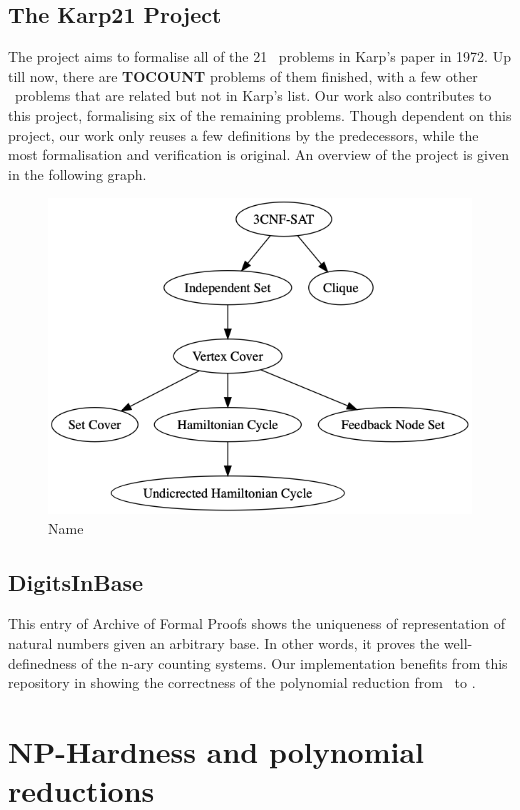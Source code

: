\subsection*{The Karp21 Project}
The project aims to formalise all of the 21 \NPH\ problems in Karp's paper in 1972. Up till now, there are \textbf{TOCOUNT} problems of them finished, with a few other \NPH\ problems that are related but not in Karp's list. Our work also contributes to this project, formalising six of the remaining problems. Though dependent on this project, our work only reuses a few definitions by the predecessors, while the most formalisation and verification is original. An overview of the project is given in the following graph.
\begin{figure}[h!]
\centering
\includegraphics[scale=0.4]{figures/reductions.png}
\caption{Name}
\end{figure}

\subsection*{DigitsInBase}
This entry of Archive of Formal Proofs shows the uniqueness of representation of natural numbers given an arbitrary base. In other words, it proves the well-definedness of the n-ary counting systems. Our implementation benefits from this repository in showing the correctness of the polynomial reduction from \XC\ to \Part.

\section{NP-Hardness and polynomial reductions}
